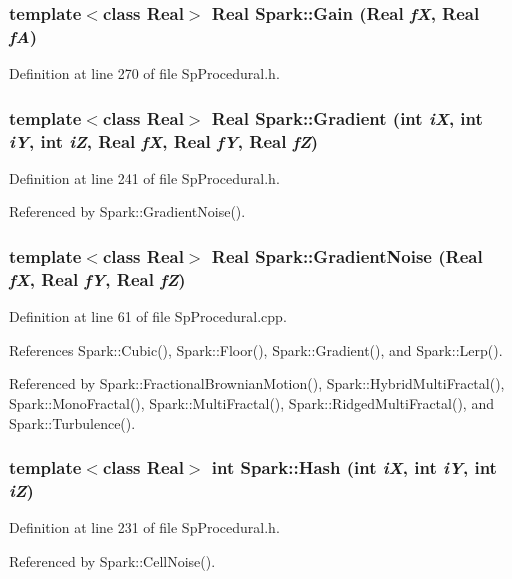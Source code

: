 \subsubsection{\setlength{\rightskip}{0pt plus 5cm}template$<$class Real$>$ Real Spark::Gain (Real {\em f\-X}, Real {\em f\-A})}\label{namespaceSpark_a97}


Definition at line 270 of file Sp\-Procedural.h.
\subsubsection{\setlength{\rightskip}{0pt plus 5cm}template$<$class Real$>$ Real Spark::Gradient (int {\em i\-X}, int {\em i\-Y}, int {\em i\-Z}, Real {\em f\-X}, Real {\em f\-Y}, Real {\em f\-Z})}\label{namespaceSpark_a95}


Definition at line 241 of file Sp\-Procedural.h.

Referenced by Spark::Gradient\-Noise().
\subsubsection{\setlength{\rightskip}{0pt plus 5cm}template$<$class Real$>$ Real Spark::Gradient\-Noise (Real {\em f\-X}, Real {\em f\-Y}, Real {\em f\-Z})}\label{namespaceSpark_a74}


Definition at line 61 of file Sp\-Procedural.cpp.

References Spark::Cubic(), Spark::Floor(), Spark::Gradient(), and Spark::Lerp().

Referenced by Spark::Fractional\-Brownian\-Motion(), Spark::Hybrid\-Multi\-Fractal(), Spark::Mono\-Fractal(), Spark::Multi\-Fractal(), Spark::Ridged\-Multi\-Fractal(), and Spark::Turbulence().
\subsubsection{\setlength{\rightskip}{0pt plus 5cm}template$<$class Real$>$ int Spark::Hash (int {\em i\-X}, int {\em i\-Y}, int {\em i\-Z})}\label{namespaceSpark_a93}


Definition at line 231 of file Sp\-Procedural.h.

Referenced by Spark::Cell\-Noise().
